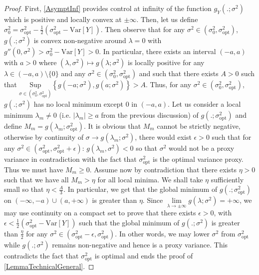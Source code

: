 \documentclass[a4paper, 10pt]{article}
\theoremstyle{definition}
\begin{document}
\begin{proof}First, \autoref{AsymptInf} provides control at infinity of the function $g_Y(.;\sigma^2)$ which is positive and locally convex at $\pm \infty$. Then, let us define $\sigma_0^2=\sigma_{\text{opt}}^2 -\frac{1}{2}(\sigma_{\text{opt}}^2-\text{Var}[Y])$. Then observe that for any $\sigma^2\in \left(\sigma_0^2,\sigma_{\text{opt}}^2\right)$, $g(.;\sigma^2)$ is convex non-negative around $\lambda=0$ with $g''(0,\sigma^2)>\sigma_0^2-\text{Var}[Y]>0$. In particular, there exists an interval $(-a,a)$ with $a>0$ where $(\lambda,\sigma^2)\mapsto g(\lambda;\sigma^2)$ is locally positive for any $\lambda\in (-a,a)\setminus\{0\}$ and any $\sigma^2\in \left(\sigma_0^2,\sigma_{\text{opt}}^2\right)$ and such that there exists $A>0$ such that $\underset{\sigma\in \left(\sigma_0^2,\sigma_{\text{opt}}^2\right)}{\text{Sup}}\left\{g(-a;\sigma^2),g(a;\sigma^2)\right\}>A$. Thus, for any $\sigma^2\in \left(\sigma_0^2,\sigma_{\text{opt}}^2\right)$, $g(.;\sigma^2)$ has no local minimum except $0$ in $(-a,a)$. Let us consider a local minimum $\lambda_m\neq 0$ (i.e. $|\lambda_m|\geq a$ from the previous discussion) of $g(.;\sigma_{\text{opt}}^2)$ and define $M_m=g(\lambda_m;\sigma_{\text{opt}}^2)$. It is obvious that $M_m$ cannot be strictly negative, otherwise by continuity of $\sigma\to g(\lambda_m;\sigma^2)$, there would exist $\epsilon>0$ such that for any $\sigma^2\in \left(\sigma_{\text{opt}}^2, \sigma_{\text{opt}}^2+\epsilon\right)$: $g(\lambda_m,\sigma^2)<0$ so that $\sigma^2$ would not be a proxy variance in contradiction with the fact that $\sigma_{\text{opt}}^2$ is the optimal variance proxy. Thus we must have $M_m\geq 0$. Assume now by contradiction that there exists $\eta>0$ such that we have all $M_m>\eta$ for all local minima. We shall take $\eta$ sufficiently small so that $\eta<\frac{A}{3}$. In particular, we get that the global minimum of $g(.;\sigma_{\text{opt}}^2)$ on $(-\infty,-a)\cup(a,+\infty)$ is greater than $\eta$. Since $\underset{\lambda\to \pm \infty}{\lim} g(\lambda;\sigma^2)=+\infty$, we may use continuity on a compact set to prove that there exists $\epsilon>0$, with $\epsilon<\frac{1}{2}(\sigma_{\text{opt}}^2-\text{Var}[Y])$ such that the global minimum of $g(.;\sigma^2)$ is greater than $\frac{\eta}{2}$ for any $\sigma^2\in \left(\sigma_{\text{opt}}^2-\epsilon,\sigma_{\text{opt}}^2\right)$. In other words, we may lower $\sigma^2$ from $\sigma_{\text{opt}}^2$ while $g(.;\sigma^2)$ remains non-negative and hence is a proxy variance. This contradicts the fact that $\sigma_{\text{opt}}^2$ is optimal and ends the proof of \autoref{LemmaTechnicalGeneral}.  
\end{proof} 
\end{document}
